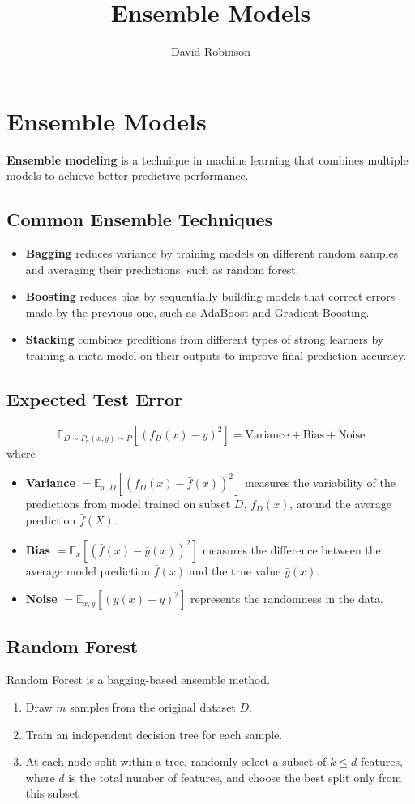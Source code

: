 \documentclass{article}
\title{Ensemble Models}
\author{David Robinson}
\date{}
\begin{document}
\maketitle

\section*{Ensemble Models}

\textbf{Ensemble modeling} is a technique in machine learning that combines multiple models to achieve better predictive performance.

\subsection*{Common Ensemble Techniques}
\begin{itemize}
    \item \textbf{Bagging} reduces variance by training models on different random samples and averaging their predictions, such as random forest.
    \item \textbf{Boosting} reduces bias by sequentially building models that correct errors made by the previous one, such as AdaBoost and Gradient Boosting.
    \item \textbf{Stacking} combines preditions from different types of strong learners by training a meta-model on their outputs to improve final prediction accuracy.
\end{itemize}

\subsection*{Expected Test Error}
\[\mathbb{E}_{D\sim P_n(x,y)\sim P}[{(f_D(x)-y)}^2]=\text{Variance}+\text{Bias}+\text{Noise}\] where
\begin{itemize}
    \item \textbf{Variance} $=\mathbb{E}_{x,D}[{(f_D(x)-\bar{f}(x))}^2]$ measures the variability of the predictions from model trained on subset $D$, $f_D(x)$, around the average prediction $\bar{f}(X)$.
    \item \textbf{Bias} $=\mathbb{E}_x [{(\bar{f}(x)-\bar{y}(x))}^2]$ measures the difference between the average model prediction $\bar{f}(x)$ and the true value $\bar{y}(x)$.
    \item \textbf{Noise} $=\mathbb{E}_{x,y} [{(\bar{y}(x)-y)}^2]$ represents the randomness in the data.
\end{itemize}

\subsection*{Random Forest}
Random Forest is a bagging-based ensemble method.
\begin{enumerate}
    \item Draw $m$ samples from the original dataset $D$.
    \item Train an independent decision tree for each sample.
    \item At each node split within a tree, randomly select a subset of $k\leq d$ features, where $d$ is the total number of features, and choose the best split only from this subset
\end{enumerate}
\end{document}

